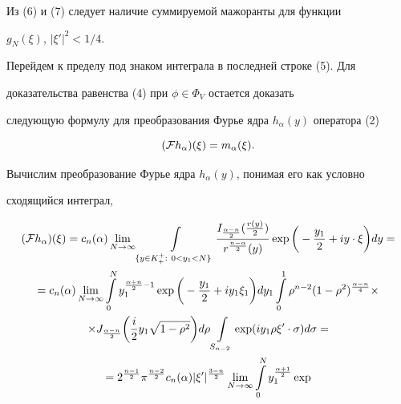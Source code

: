 \begin{pf}
\begin{equation}
\end{equation}


Из (6) и (7) следует наличие суммируемой мажоранты для функции


$g_N(\xi)$, $|\xi'|^2<1/4$.





Перейдем к пределу под знаком интеграла в последней строке (5). Для


доказательства равенства (4) при $\phi\in \Phi_V$ остается доказать


следующую формулу для преобразования Фурье ядра $h_\alpha(y)$ оператора (2)


\begin{equation}


(\F h_\alpha)(\xi)=m_\alpha(\xi).


\end{equation}


Вычислим преобразование Фурье ядра $h_\alpha(y)$, понимая его как условно


сходящийся интеграл,


\begin{multline*}


(\F h_\alpha)(\xi)=c_n(\alpha)\lim\limits_{N\to\infty}\int\limits_


{\{y\in K_+^+:\ 0<y_1<N\}}\frac{I_{\frac{\alpha-n}{2}}(\frac{r(y)}{2})}


{r^{\frac{n-\alpha}{2}}(y)}\exp\bigg(-\frac{y_1}{2}+iy\cdot\xi\bigg)dy= \\


%


=c_n(\alpha)\lim\limits_{N\to\infty}\int\limits_0^N y_1^{\frac{\alpha+n}{2}


-1}\exp\bigg(-\frac{y_1}{2}+iy_1{\xi}_1\bigg)


dy_1\int\limits_0^1\rho^{n-2}(1-{\rho}^2)^


{\frac{\alpha-n}{4}}\times \\


%


\times J_{\frac{\alpha-n}{2}}\bigg(\frac{i}{2}y_1\sqrt{1-{\rho}^2}\bigg)


d\rho\int\limits_{S_{n-2}}\exp(iy_1\rho\xi'\cdot\sigma)d\sigma= \\


%


=2^{\frac{n-1}{2}}\pi^{\frac{n-2}{2}}c_n(\alpha)|\xi'|^{\frac{3-n}{2}}


\lim\limits_{N\to\infty}\int\limits_0^Ny_1^{\frac{\alpha+1}{2}}\exp



\end{multline*}
\end{pf}
